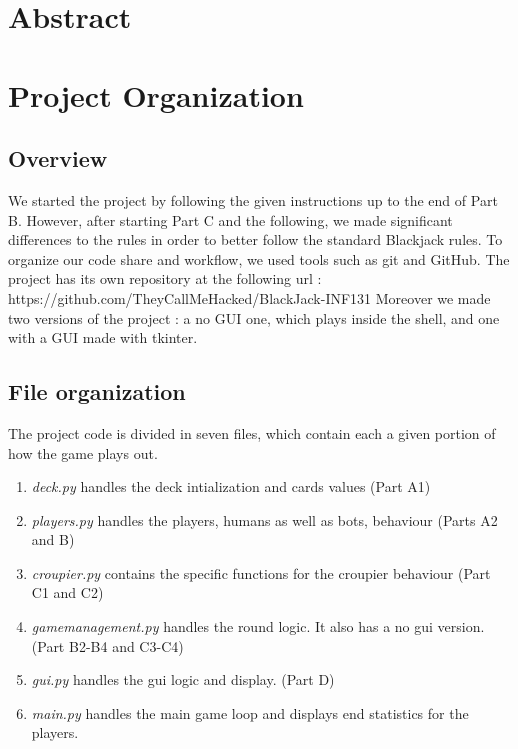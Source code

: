 \documentclass[a4paper, twoside]{report}
\begin{document}
    \lipsum[1]

\clearpage

{ \hypersetup{hidelinks} \tableofcontents {} }

\setcounter{page}{1}
\chapter*{Abstract}
\label{chap:abstract}
    \lipsum[1-2]

\chapter{Project Organization}

    \section{Overview}
        \par
        We started the project by following the given instructions up to the end of Part B. 
        However, after starting Part C and the following, we made significant differences to the rules in order to better 
        follow the standard Blackjack rules.
        To organize our code share and workflow, we used tools such as git and GitHub.\linebreak
        The project has its own repository at the following url : \linebreak
        https://github.com/TheyCallMeHacked/BlackJack-INF131
        \linebreak
        Moreover we made two versions of the project : a no GUI one, which plays inside the shell, and one with a GUI made with tkinter.
    \section{File organization}
        \par
        The project code is divided in seven files, which contain each a given portion of how the game plays out. 
        \begin{enumerate}
            \item \textit{deck.py} handles the deck intialization and cards values (Part A1)
            \item \textit{players.py} handles the players, humans as well as bots, behaviour (Parts A2 and B)
            \item \textit{croupier.py} contains the specific functions for the croupier behaviour (Part C1 and C2)
            \item \textit{gamemanagement.py} handles the round logic. It also has a no gui version. (Part B2-B4 and C3-C4) 
            \item \textit{gui.py} handles the gui logic and display. (Part D)
            \item \textit{main.py} handles the main game loop and displays end statistics for the players.
        \end{enumerate}
\end{document}
